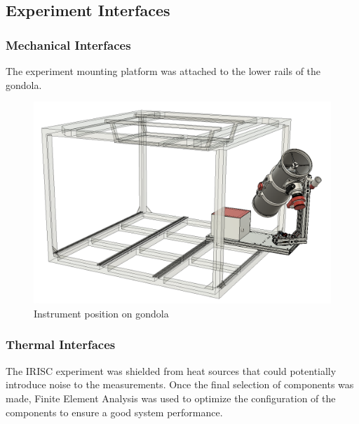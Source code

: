 \subsection{Experiment Interfaces}

\subsubsection{Mechanical Interfaces}
\label{sec:4.2.1}


The experiment mounting platform was attached to the lower rails of the gondola.



\begin{figure}[H]
    \centering
	\includegraphics[width=0.9\linewidth]{4-experiment-design/img/mechanical/iso0.png}
	\caption{Instrument position on gondola}
\end{figure}


% 


\subsubsection{Thermal Interfaces}


The IRISC experiment was shielded from heat sources that could potentially introduce noise to the measurements. Once the final selection of components was made, Finite Element Analysis was used to optimize the configuration of the components to ensure a good system performance.


